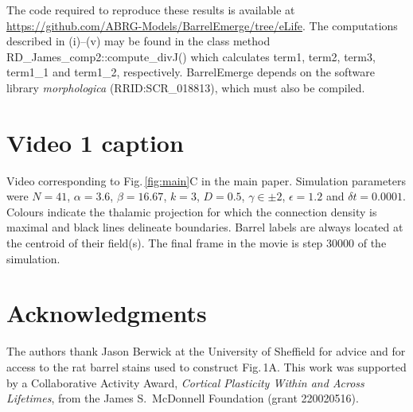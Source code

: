 \documentclass[9pt,lineno]{elife}
\newcommand{\cmnt}[1]{\textcolor{colcmnt}{#1}}
\newcommand{\code}[1]{\textsf{#1}}
\begin{document}
The code required to reproduce these results is available at
\url{https://github.com/ABRG-Models/BarrelEmerge/tree/eLife}. The computations
described in (i)--(v) may be found in the class method
\code{RD\_James\cmnt{\_comp2}::compute\_divJ()} which calculates \code{term1},
\code{term2}, \code{term3}, \code{term1\_1} and \code{term1\_2}, respectively.
BarrelEmerge depends on the software library \emph{morphologica}
(RRID:SCR\_018813), which must also be compiled.

\section{Video 1 caption}

Video corresponding to Fig.\,\ref{fig:main}C in the main paper. Simulation parameters were
\cmnt{$N=41$, $\alpha=3.6$, $\beta=16.67$, $k=3$, $D=0.5$, $\gamma\in\pm 2$,
$\epsilon=1.2$ and $\delta{t}=0.0001$}. Colours indicate the thalamic
projection for which the connection density is maximal and black lines delineate
boundaries. \cmnt{Barrel labels are
  always located at the centroid of their field(s).} The final frame in the movie
is step 30000 of the simulation.

\section{Acknowledgments}

The authors thank Jason Berwick at the University of Sheffield for advice and
for access to the rat barrel stains used to construct Fig.\,1A. This work was
supported by a Collaborative Activity Award, \emph{Cortical Plasticity Within
  and Across Lifetimes}, from the James S.~McDonnell Foundation (grant
220020516).
\end{document}
